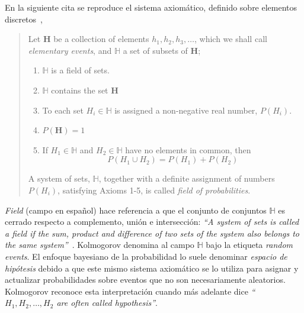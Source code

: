 \documentclass[a4paper,11pt]{book}
\theoremstyle{definition}
\begin{document}
En la siguiente cita se reproduce el sistema axiom\'atico, definido sobre elementos discretos~\cite{Kolmogorov1950},
%
\begin{quotation}
Let $\textbf{H}$ be a collection of elements $h_1, h_2, h_3, \dots$,  which we shall call \emph{elementary events}, and $\mathbb{H}$ a set of subsets of $\textbf{H}$;
\begin{enumerate}\itemsep-0.05cm
  \item $\mathbb{H}$ is a field of sets.
  \item $\mathbb{H}$ contains the set $\textbf{H}$
  \item To each set $H_i \in \mathbb{H}$ is assigned a non-negative real number, $P(H_i)$. \label{item:Kol_3}
  \item $P(\textbf{H}) = 1$ \label{item:Kol_4}
  \item If $H_1 \in \mathbb{H}$ and $H_2 \in \mathbb{H}$ have no elements in common, then
\begin{equation}
  P(H_1 \cup H_2 ) = P(H_1) + P(H_2)
\end{equation} \label{item:Kol_5}
\end{enumerate}
A system of sets, $\mathbb{H}$, together with a definite assignment of numbers $P(H_i)$, satisfying Axioms 1-5, is called \emph{field of probabilities}.
%
%
%
\end{quotation}
%
\emph{Field} (campo en espa\~nol) hace referencia a que el conjunto de conjuntos $\mathbb{H}$ es cerrado respecto a complemento, uni\'on e intersecci\'on: \emph{``A system of sets is called a field if the sum, product and difference of two sets of the system also belongs to the same system''}~\cite{Kolmogorov1950}.
%
Kolmogorov denomina al campo $\mathbb{H}$ bajo la etiqueta \emph{random events}.
%
El enfoque bayesiano de la probabilidad lo suele denominar \emph{espacio de hip\'otesis} debido a que este mismo sistema axiom\'atico se lo utiliza para asignar y actualizar probabilidades sobre eventos que no son necesariamente aleatorios.
%
Kolmogorov reconoce esta interpretaci\'on cuando m\'as adelante dice \emph{``$H_1, H_2, \dots, H_2$ are often called hypothesis''}.
\end{document}
